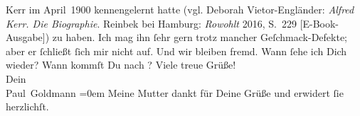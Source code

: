 \begin{ledgroupsized}[t]{13cm}
{{{                     Kerr im April 1900 kennengelernt hatte (vgl.
                     Deborah Vietor-Engländer: \emph{Alfred Kerr. Die
                        Biographie}. Reinbek bei Hamburg:
                        \emph{Rowohlt}{ }2016, S. 229 [E-Book-Ausgabe])}}}\label{K_L02911-11h} zu haben. Ich mag ihn ſehr gern trotz mancher Geſchmack-Defekte; aber er
               ſchließt ſich mir nicht auf. {\pb}Und wir bleiben
               fremd.\pend
           \pstart
           Wann ſehe ich Dich wieder? Wann kommſt Du nach \label{K_L02911-12v}\label{K_L02911-12h}?\pend
           \pstart
           Viele treue Grüße! {\\[\baselineskip]}Dein {\\[\baselineskip]}\spacefill\mbox{Paul Goldmann}\pend
           \leftskip=0em{}\pstart
           \noindent{}Meine Mutter dankt für
                  Deine Grüße und erwidert ſie herzlichſt.\pend
           
         
         \endnumbering{}\end{ledgroupsized}\begin{anhang}\end{anhang}\newcommand{\dateiname}{L02911}\newcommand{\titel}{Paul Goldmann an Arthur Schnitzler, 18. 4. [1900]}\newcommand{\editorInnen}{Martin Anton Müller und Laura Untner}
      